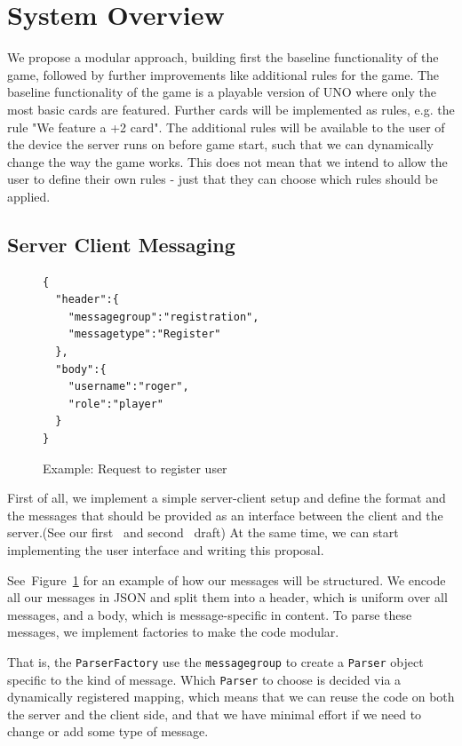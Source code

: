 \documentclass{report}
\newcommand{\lfig}[1]{\label{fig:#1}}
\newcommand{\rfig}[1]{Figure~\ref{fig:#1}}
\begin{document}
\section{System Overview}
We propose a modular approach, building first the baseline functionality of the game, followed by further improvements like additional rules for the game. The baseline functionality of the game is a playable version of UNO where only the most basic cards are featured. Further cards will be implemented as rules, e.g. the rule "We feature a +2 card". The additional rules will be available to the user of the device the server runs on before game start, such that we can dynamically change the way the game works. This does not mean that we intend to allow the user to define their own rules - just that they can choose which rules should be applied.

\subsection{Server Client Messaging}
\begin{figure}
\begin{verbatim}
{
  "header":{
    "messagegroup":"registration",
    "messagetype":"Register"
  },
  "body":{
    "username":"roger",
    "role":"player"
  }
}
\end{verbatim}
\caption{Example: Request to register user}
\lfig{regmsg}
\end{figure}

First of all, we implement a simple server-client setup and define the format and the messages that should be provided as an interface between the client and the server.(See our first~\cite{messaging} and second~\cite{messaging2} draft) At the same time, we can start implementing the user interface and writing this proposal.

See~\rfig{regmsg} for an example of how our messages will be structured. We encode all our messages in JSON and split them into a header, which is uniform over all messages, and a body, which is message-specific in content. To parse these messages, we implement factories to make the code modular.

That is, the \verb|ParserFactory| use the \verb|messagegroup| to create a \verb|Parser| object specific to the kind of message. Which \verb|Parser| to choose is decided via a dynamically registered mapping, which means that we can reuse the code on both the server and the client side, and that we have minimal effort if we need to change or add some type of message.
\end{document}
